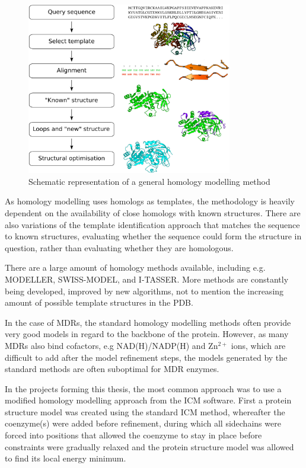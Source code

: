 \documentclass[a4paper, twoside, 12pt, openright]{report}
\begin{document}
\begin{figure}[htbp]
 \includegraphics[width=0.8\textwidth]{fig/hom_mod.pdf}
 \caption{Schematic representation of a general homology modelling method}
 \label{fig:hom_mod_procedure}
\end{figure}

As homology modelling uses homologs as templates, the methodology is heavily dependent on the availability of close homologs with known structures. There are also variations of the template identification approach that matches the sequence to known structures, evaluating whether the sequence could form the structure in question, rather than evaluating whether they are homologous.

There are a large amount of homology methods available, including e.g. MODELLER\cite{sali_comparative_1993}, SWISS-MODEL\cite{arnold_swiss-model_2006}, and I-TASSER\cite{roy_i-tasser:_2010}. More methods are constantly being developed, improved by new algorithms, not to mention the increasing amount of possible template structures in the PDB.

In the case of MDRs, the standard homology modelling methods often provide very good models in regard to the backbone of the protein. However, as many MDRs also bind cofactors, e.g NAD(H)/NADP(H) and Zn$^{2+}$ ions, which are difficult to add after the model refinement steps, the models generated by the standard methods are often suboptimal for MDR enzymes.

In the projects forming this thesis, the most common approach was to use a modified homology modelling approach from the ICM software. First a protein structure model was created using the standard ICM method\cite{abagyan_homology_1997}, whereafter the coenzyme(s) were added before refinement, during which all sidechains were forced into positions that allowed the coenzyme to stay in place before constraints were gradually relaxed and the protein structure model was allowed to find its local energy minimum.
\end{document}
